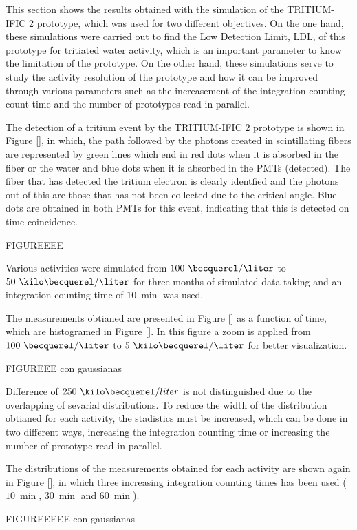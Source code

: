 This section shows the results obtained with the simulation of the TRITIUM-IFIC 2 prototype, which was used for two different objectives. On the one hand, these simulations were carried out to find the Low Detection Limit, LDL, of this prototype for tritiated water activity, which is an important parameter to know the limitation of the prototype. On the other hand, these simulations serve to study the activity resolution of the prototype and  how it can be improved through various parameters such as the increasement of the integration counting count time and the number of prototypes read in parallel.

The detection of a tritium event by the TRITIUM-IFIC 2 prototype is shown in Figure \ref{}, in which, the path followed by the photons created in scintillating fibers are represented by green lines which end in red dots when it is absorbed in the fiber or the water and blue dots when it is absorbed in the PMTs (detected). The fiber that has detected the tritium electron is clearly identfied and the photons out of this are those that has not been collected due to the critical angle. Blue dots are obtained in both PMTs for this event, indicating that this is detected on time coincidence.

FIGUREEEE

Various activities were simulated from $100~\becquerel/\liter$ to $50~\kilo\becquerel/\liter$ for three months of simulated data taking and an integration counting time of $10~\min$ was used.

The measurements obtianed are presented in Figure \ref{} as a function of time, which are histogramed in Figure \ref{}. In this figure a zoom is applied from $100~\becquerel/\liter$ to $5~\kilo\becquerel/\liter$ for better visualization.

FIGUREEE con gaussianas

Difference of $250~\kilo\becquerel/liter$ is not distinguished due to the overlapping of sevarial distributions. To reduce the width of the distribution obtianed for each activity, the stadistics must be increased, which can be done in two different ways, increasing the integration counting time or increasing the number of prototype read in parallel.

The distributions of the measurements obtained for each activity are shown again in Figure \ref{}, in which three increasing integration counting times has been used ($10~\min$, $30~\min$ and $60~\min$).

FIGUREEEEE con gaussianas


